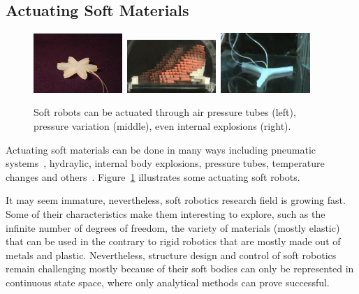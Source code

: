 \subsection*{Actuating Soft Materials}

\begin{figure}[t!]
\centering
\includegraphics[width=0.3\textwidth,height=0.13\textheight]{../Figures/Misc/soft_robotics_figure.png}\		
\includegraphics[width=0.3\textwidth,height=0.13\textheight]{../Figures/Misc/hillerPressureChamber.png}\	
\includegraphics[width=0.3\textwidth,height=0.13\textheight]{../Figures/Misc/ExplodingRobot.jpg}\\
\caption{Soft robots can be actuated through air pressure tubes (left), pressure variation (middle), even internal explosions (right).}
\label{fig:softRobotsActuation}
\end{figure}

Actuating soft materials can be done in many ways including pneumatic systems~\cite{ilievski2011soft, shepherd2011multigait}, hydraylic, internal body explosions, pressure tubes, temperature changes and others~\cite{laschi2012soft, seok2010peristaltic}. Figure~\ref{fig:softRobotsActuation} illustrates some actuating soft robots. 

It may seem immature, nevertheless, soft robotics research field is growing fast. Some of their characteristics make them interesting to explore, such as the infinite number of degrees of freedom, the variety of materials (mostly elastic) that can be used in the contrary to rigid robotics that are mostly made out of metals and plastic. Nevertheless, structure design and control of soft robotics remain challenging mostly because of their soft bodies can only be represented in continuous state space, where only analytical methods can prove successful.

